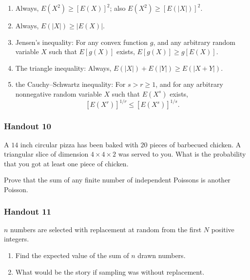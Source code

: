 \begin{problem}[Handout 9, \# 15]
  \hfill
  \begin{enumerate}[label=(\alph*),noitemsep]
  \item Always, \(E(X^2)\geq [E(X)]^2\); also \(E(X^2)\geq [E(|X|)]^2\).
  \item Always, \(E(|X|)\geq |E(X)|\).
  \item Jensen's inequality: For any convex function \(g\), and any
    arbitrary random variable \(X\) such that \(E[g(X)]\) exists,
    \(E[g(X)]\geq g[E(X)]\).
  \item The triangle inequality: Always, \(E(|X|)+E(|Y|)\geq E(|X+Y|)\).
  \item the Cauchy--Schwartz inequality: For \(s>r\geq 1\), and for any
    arbitrary nonnegative random variable \(X\) such that \(E(X^s)\)
    exists,
    \[
      [E(X^r)]^{1/r}\leq [E(X^s)]^{1/s}.
    \]
  \end{enumerate}
\end{problem}
\begin{solution*}
\end{solution*}

\subsubsection{Handout 10}
\begin{problem}[Handout 10, \# 3]
  A \(14\) inch circular pizza has been baked with \(20\) pieces of
  barbecued chicken. A triangular slice of dimension \(4\times 4\times 2\)
  was served to you. What is the probability that you got at least one
  piece of chicken.
\end{problem}
\begin{solution*}
\end{solution*}

\begin{problem}[Handout 10, \# 15]
  Prove that the sum of any finite number of independent Poissons is
  another Poisson.
\end{problem}
\begin{solution*}
\end{solution*}

\subsubsection{Handout 11}
\begin{problem}[Handout 11, 4]
  \(n\) numbers are selected with replacement at random from the first
  \(N\) positive integers.
  \begin{enumerate}[label=(\alph*),noitemsep]
  \item Find the expected value of the sum of \(n\) drawn numbers.
  \item What would be the story if sampling was without replacement.
  \end{enumerate}
\end{problem}
\begin{solution*}
\end{solution*}

